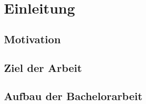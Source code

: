 \chapter{Einleitung}
\label{cha:Einleitung}

\section{Motivation}


\section{Ziel der Arbeit}


\section{Aufbau der Bachelorarbeit}
